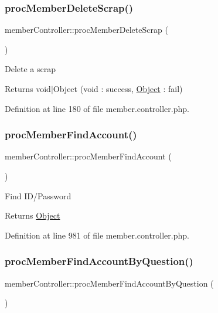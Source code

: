 \subsubsection{\texorpdfstring{proc\+Member\+Delete\+Scrap()}{procMemberDeleteScrap()}}
{\footnotesize\ttfamily member\+Controller\+::proc\+Member\+Delete\+Scrap (\begin{DoxyParamCaption}{ }\end{DoxyParamCaption})}

Delete a scrap

\begin{DoxyReturn}{Returns}
void$\vert$\+Object (void \+: success, \hyperlink{classObject}{Object} \+: fail) 
\end{DoxyReturn}


Definition at line 180 of file member.\+controller.\+php.

\mbox{\label{classmemberController_a6ba64b98fa5d0fd55435e464f02d050e}} 
\subsubsection{\texorpdfstring{proc\+Member\+Find\+Account()}{procMemberFindAccount()}}
{\footnotesize\ttfamily member\+Controller\+::proc\+Member\+Find\+Account (\begin{DoxyParamCaption}{ }\end{DoxyParamCaption})}

Find I\+D/\+Password

\begin{DoxyReturn}{Returns}
\hyperlink{classObject}{Object} 
\end{DoxyReturn}


Definition at line 981 of file member.\+controller.\+php.

\mbox{\label{classmemberController_a1141d3b40fc5927dcbaff3b4b4b11bff}} 
\subsubsection{\texorpdfstring{proc\+Member\+Find\+Account\+By\+Question()}{procMemberFindAccountByQuestion()}}
{\footnotesize\ttfamily member\+Controller\+::proc\+Member\+Find\+Account\+By\+Question (\begin{DoxyParamCaption}{ }\end{DoxyParamCaption})}

